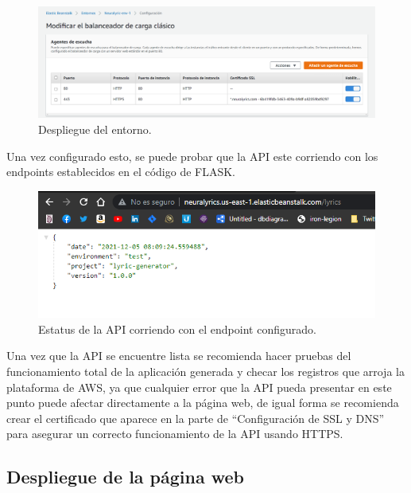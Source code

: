 \documentclass[12pt, a4paper, titlepage]{article}
\begin{document}
		\begin{figure}[H]
			\includegraphics[width=12cm]{./Imagenes/BackEnd/config_balanceador.png}
			\centering 
			\caption{Despliegue del entorno.}
		\end{figure}
		Una vez configurado esto, se puede probar que la API este corriendo con los endpoints establecidos en el código de FLASK.
		\begin{figure}[H]
			\includegraphics[width=12cm]{./Imagenes/BackEnd/api_corriendo.png}
			\centering 
			\caption{Estatus de la API corriendo con el endpoint configurado.}
		\end{figure}
		Una vez que la API se encuentre lista se recomienda hacer pruebas del funcionamiento total de la aplicación generada y checar los registros que arroja la plataforma de AWS, ya que cualquier error que la API pueda presentar en este punto puede afectar directamente a la página web, de igual forma se recomienda crear el certificado que aparece en la parte de “Configuración de SSL y DNS” para asegurar un correcto funcionamiento de la API usando HTTPS.
	\newpage
	\subsection{Despliegue de la página web}
	
\end{document}

